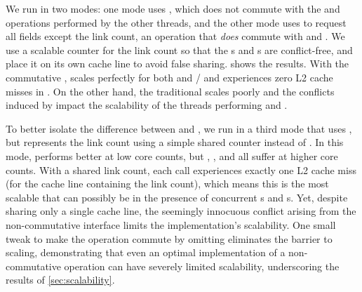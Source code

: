 %   

We run  in two modes: one mode uses , which does
not commute with the  and  operations performed
by the other threads, and the other mode uses  to request
all fields except the link count, an operation that \emph{does} commute
with  and .  We use a  scalable
counter for the link count so that the
s and s are conflict-free, and place it on
its own cache line to avoid false sharing.
 shows the results.  With the commutative
,  scales perfectly for both  and
/ and experiences zero L2 cache
misses in .  On the other hand, the traditional
 scales poorly and the conflicts induced by 
impact the scalability of the threads performing  and
.

To better
isolate the difference between  and , we run
 in a
third mode that uses , but represents the link count
using a simple shared counter instead of .  In this mode, 
performs better at low core counts, but , , and
 all suffer at higher core counts.
%
With a shared link count, each 
call experiences exactly one L2 cache miss (for the cache line
containing the link count), which means this is the most scalable that
 can possibly be in the presence of concurrent s
and s.  Yet, despite sharing only a single cache line, the
seemingly innocuous conflict arising from the non-commutative
interface limits the
implementation's scalability.  One small tweak to make the operation
commute by omitting  eliminates the barrier to scaling,
demonstrating that even an optimal implementation of a non-commutative
operation can have severely limited scalability, underscoring the
results of \cref{sec:scalability}.

